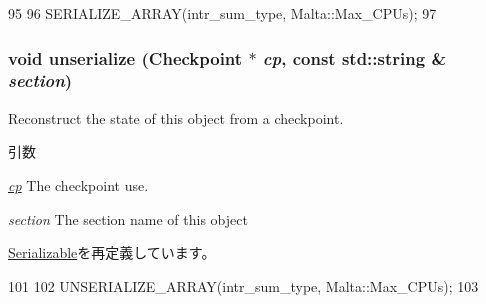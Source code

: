 \begin{DoxyCode}
95 {
96     SERIALIZE_ARRAY(intr_sum_type, Malta::Max_CPUs);
97 }
\end{DoxyCode}
\hypertarget{classMalta_af22e5d6d660b97db37003ac61ac4ee49}{
\subsubsection[{unserialize}]{\setlength{\rightskip}{0pt plus 5cm}void unserialize ({\bf Checkpoint} $\ast$ {\em cp}, \/  const std::string \& {\em section})}}
\label{classMalta_af22e5d6d660b97db37003ac61ac4ee49}
Reconstruct the state of this object from a checkpoint. 
\begin{DoxyParams}{引数}
\item[{\em \hyperlink{namespacecp}{cp}}]The checkpoint use. \item[{\em section}]The section name of this object \end{DoxyParams}


\hyperlink{classSerializable_af100c4e9feabf3cd918619c88c718387}{Serializable}を再定義しています。


\begin{DoxyCode}
101 {
102     UNSERIALIZE_ARRAY(intr_sum_type, Malta::Max_CPUs);
103 }
\end{DoxyCode}



